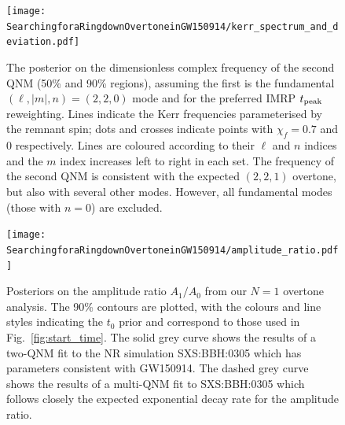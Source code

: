 \begin{figure}
    \centering
    \texttt{[image: SearchingforaRingdownOvertoneinGW150914/kerr\_spectrum\_and\_deviation.pdf]}
    \caption[Posterior on the complex frequency of the second GW150914 quasinormal mode assuming the first is associated with the fundamental mode]{ 
    The posterior on the dimensionless complex frequency of the second QNM (50\% and 90\% regions), assuming the first is the fundamental $(\ell,|m|,n)=(2,2,0)$ mode and for the preferred IMRP $t_{\rm peak}$ reweighting.
    Lines indicate the Kerr frequencies parameterised by the remnant spin; dots and crosses indicate points with $\chi_f=0.7$ and $0$ respectively.
    Lines are coloured according to their $\ell$ and $n$ indices and the $m$ index increases left to right in each set.
    The frequency of the second QNM is consistent with the expected $(2,2,1)$ overtone, but also with several other modes.
    However, all fundamental modes (those with $n=0$) are excluded.
    }
    \label{fig:other_QNMs}
\end{figure}

\begin{figure}[t]
    \centering
    \texttt{[image: SearchingforaRingdownOvertoneinGW150914/amplitude\_ratio.pdf]}
    \caption[Posteriors on the GW150914 overtone amplitude divided by the fundamental-mode amplitude for each choice of the ringdown start-time prior]{ 
    Posteriors on the amplitude ratio $A_1/A_0$ from our $N=1$ overtone analysis. 
    The 90\% contours are plotted, with the colours and line styles indicating the $t_0$ prior and correspond to those used in Fig.~\ref{fig:start_time}.
    The solid grey curve shows the results of a two-QNM fit to the NR simulation SXS:BBH:0305 which has parameters consistent with GW150914.
    The dashed grey curve shows the results of a multi-QNM fit to SXS:BBH:0305 which follows closely the expected exponential decay rate for the amplitude ratio.
    }
    \label{fig:amp_ratio}
\end{figure}

